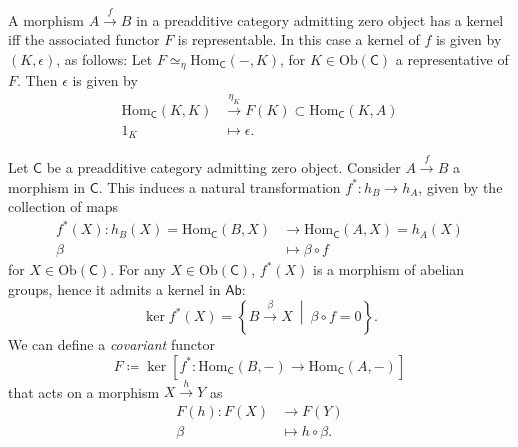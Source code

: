 \begin{prop}
	A morphism $A \xrightarrow{f} B$ in a preadditive category admitting zero object has a kernel iff the associated functor $F$ is representable.
	In this case a kernel of $f$ is given by $\left(K, \epsilon\right)$, as follows:
	Let $F \simeq_\eta \mathrm{Hom}_{\mathsf{C}} \left( -, K \right)$, for $K \in \mathrm{Ob} \left(\mathsf{C}\right)$ a representative of $F$.
	Then $\epsilon$ is given by
	\begin{align}
		\mathrm{Hom}_{\mathsf{C}} \left( K, K \right) &\xrightarrow{\eta_K} F(K) 
		\subset \mathrm{Hom}_{\mathsf{C}} \left( K, A \right)\\
		1_K &\mapsto \epsilon
	.\end{align} 
\end{prop} 

\begin{defn}
	Let $\mathsf{C}$ be a preadditive category admitting zero object.
	Consider $A \xrightarrow{f} B$ a morphism in $\mathsf{C}$.
	This induces a natural transformation
	$f^*\colon h_B \to h_A$, given by the collection of maps
	\begin{align}
		f^*(X)\colon h_B(X) = \mathrm{Hom}_{\mathsf{C}} \left( B, X \right) &\to
		\mathrm{Hom}_{\mathsf{C}} \left( A, X \right) = h_A(X) \\
		\beta &\mapsto \beta \circ f
	\end{align} 
	for $X \in \mathrm{Ob} \left(\mathsf{C}\right)$.
	For any $X \in \mathrm{Ob} \left(\mathsf{C}\right)$, $f^*(X)$ is a morphism of abelian groups, hence it admits a kernel in $\mathsf{Ab}$:
	\begin{equation}
		\ker f^*(X) = \left\{ B \xrightarrow{\beta} X \ \middle|\ \beta \circ f = 0 \right\}
	.\end{equation} 
	We can define a {\em covariant} functor
	\begin{equation}
	F \coloneqq \ker \left[ f^*\colon \mathrm{Hom}_{\mathsf{C}} \left( B, - \right) \to \mathrm{Hom}_{\mathsf{C}} \left( A, - \right) \right]
	\end{equation} 
	that acts on a morphism $X \xrightarrow{h} Y$ as
	\begin{align}
		F(h)\colon F(X) &\to F(Y) \\
		\beta &\mapsto h \circ \beta
	.\end{align} 
\end{defn}

